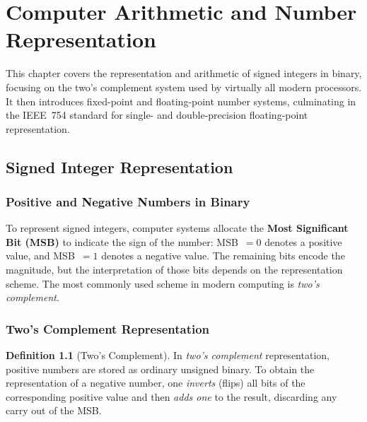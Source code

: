 \documentclass[11pt, a4paper, notitlepage]{report}
\theoremstyle{definition}
\newtheorem{definition}[theorem]{Definition}
\theoremstyle{remark}
\theoremstyle{definition}
\begin{document}
\chapter{Computer Arithmetic and Number Representation}
\label{chap:comp-arith}

This chapter covers the representation and arithmetic of signed integers in binary, focusing on the two's complement system used by virtually all modern processors. It then introduces fixed-point and floating-point number systems, culminating in the IEEE~754 standard for single- and double-precision floating-point representation.

\section{Signed Integer Representation}
\label{sec:signed-int}

\subsection{Positive and Negative Numbers in Binary}
\label{sec:pos-neg}

To represent signed integers, computer systems allocate the \textbf{Most Significant Bit (MSB)} to indicate the sign of the number: MSB~$= 0$ denotes a positive value, and MSB~$= 1$ denotes a negative value. The remaining bits encode the magnitude, but the interpretation of those bits depends on the representation scheme. The most commonly used scheme in modern computing is \emph{two's complement}.

\subsection{Two's Complement Representation}
\label{sec:twos-complement}

\begin{definition}[Two's Complement]
  \label{def:twos-complement}
  In \emph{two's complement} representation, positive numbers are stored as ordinary unsigned binary. To obtain the representation of a negative number, one \emph{inverts} (flips) all bits of the corresponding positive value and then \emph{adds one} to the result, discarding any carry out of the MSB.
\end{definition}
\end{document}
